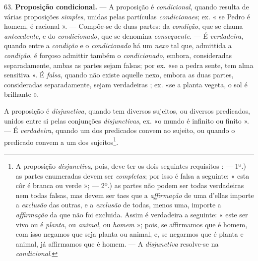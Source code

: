 63. \textbf{Proposição condicional.} --- A proposição é \emph{condicional}, quando resulta de várias proposições \emph{simples}, unidas pelas partículas \emph{condicionaes}; ex. « se Pedro é homem, é racional ». --- Compõe-se de duas partes: da \emph{condição}, que se chama \emph{antecedente}, e do \emph{condicionado}, que se denomina \emph{consequente}. --- É \emph{verdadeira}, quando entre a \emph{condição} e o \emph{condicionado} há um \emph{nexo} tal que, admittida a \emph{condição}, é forçoso admittir também o \emph{condicionado}, embora, consideradas separadamente, ambas as partes sejam falsas; por ex. «se a pedra sente, tem alma sensitiva  ». É \emph{falsa}, quando não existe aquelle nexo, embora as duas partes, consideradas separadamente, sejam verdadeiras ; ex. «se a planta vegeta, o sol é brilhante ».


A proposição é \emph{disjunctiva}, quando tem diversos sujeitos, ou diversos predicados, unidos entre si pelas conjunções \emph{disjunctivas}, ex. «o mundo é infinito ou finito ». --- É \emph{verdadeira}, quando um dos predicados convem ao sujeito, ou quando o predicado convem a um dos sujeitos\footnote{A proposição \emph{disjunctiva}, pois, deve ter os dois seguintes requisitos : --- 1º.) as partes enumeradas devem ser \emph{completas}; por isso é falsa a seguinte: « esta côr é branca ou verde »; --- 2º.) as partes não podem ser todas verdadeiras nem todas falsas, mas devem ser taes que a \emph{affirmação} de uma d'ellas importe a \emph{exclusão} das outras, e a \emph{exclusão} de todas, menos uma, importe a \emph{affirmação} da que não foi excluida. Assim é verdadeira a seguinte: « este ser vivo ou é \emph{planta}, ou \emph{animal}, ou \emph{homem} »; pois, se affirmamos que é homem, com isso negamos que seja planta ou animal, e, se negarmos que é planta e animal, já affirmamos que é homem. --- A \emph{disjunctiva} resolve-se na \emph{condicional}.}.


